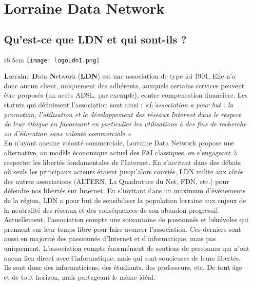 \section{Lorraine Data Network}
	\subsection{Qu'est-ce que LDN et qui sont-ils ?}
		\vspace{0.3cm}

		\begin{wrapfigure}[10]{r}{6.5cm}
			\vspace{-0.7cm}
			\texttt{[image: logoLdn1.png]}
		\end{wrapfigure}
	
		\textbf{L}orraine \textbf{D}ata \textbf{N}etwork (\textbf{LDN}) est une association de type loi 1901. Elle n’a donc aucun client, uniquement des adhérents, auxquels certains services peuvent être proposés (un accès ADSL, par exemple), contre compensation financière. Les statuts qui définissent l’association sont ainsi : \emph{«L’association a pour but : la promotion, l’utilisation et le développement des réseaux Internet dans le respect de leur éthique en favorisant en particulier les utilisations à des fins de recherche ou d’éducation sans volonté commerciale.»}\\

		En n'ayant aucune volonté commerciale, Lorraine Data Network propose une alternative, au modèle économique actuel des FAI classiques, en s’engageant à respecter les libertés fondamentales de l'Internet. En s’invitant dans des débats où seuls les principaux acteurs étaient jusqu’alors conviés, LDN milite aux côtés des autres associations (ALTERN, La Quadrature du Net, FDN, etc.) pour défendre nos libertés sur Internet. En s’invitant dans un maximum d’événements de la région, LDN a pour but de sensibiliser la population lorraine aux enjeux de la neutralité des réseaux et des conséquences de son abandon progressif.\\

		Actuellement, l'association compte une soixantaine de passionnés et bénévoles qui prennent sur leur temps libre pour faire avancer l’association. Ces derniers sont aussi en majorité des passionnés d’Internet et d’informatique, mais pas uniquement. L'association compte énormément de soutiens de personnes qui n’ont aucun lien direct avec l’informatique, mais qui sont soucieuses de leurs libertés. Ils sont donc des informaticiens, des étudiants, des professeurs, etc. De tout âge et de tout horizon, mais partageant le même idéal.\\

